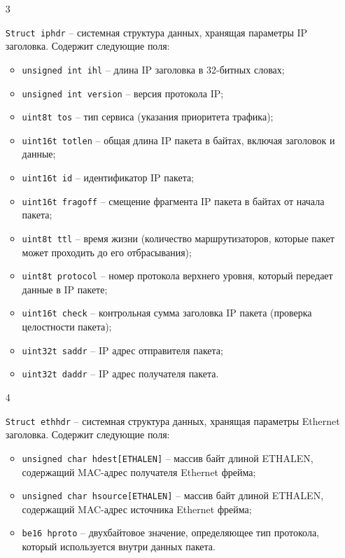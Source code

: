 \begin{enumerate}
    \item[3] {{\texttt{Struct iphdr}} -- системная структура данных, хранящая параметры IP
    заголовка. Содержит следующие поля:
        \begin{itemize}
            \item \texttt{unsigned int ihl} -- длина IP заголовка в 32-битных словах;
            \item \texttt{unsigned int version} -- версия протокола IP;
            \item \texttt{u{\textunderscore}int8{\textunderscore}t tos} -- тип сервиса (указания приоритета трафика);
            \item \texttt{u{\textunderscore}int16{\textunderscore}t tot{\textunderscore}len} -- общая длина IP пакета в байтах, включая
            заголовок и данные;
            \item \texttt{u{\textunderscore}int16{\textunderscore}t id} -- идентификатор IP пакета;
            \item \texttt{u{\textunderscore}int16{\textunderscore}t frag{\textunderscore}off} -- смещение фрагмента IP пакета в байтах от
            начала пакета;
            \item \texttt{u{\textunderscore}int8{\textunderscore}t ttl} -- время жизни (количество маршрутизаторов,
            которые пакет может проходить до его отбрасывания);
            \item \texttt{u{\textunderscore}int8{\textunderscore}t protocol} -- номер протокола верхнего уровня, который
            передает данные в IP пакете;
            \item \texttt{u{\textunderscore}int16{\textunderscore}t check} -- контрольная сумма заголовка IP пакета
            (проверка целостности пакета);
            \item \texttt{u{\textunderscore}int32{\textunderscore}t saddr} -- IP адрес отправителя пакета;
            \item \texttt{u{\textunderscore}int32{\textunderscore}t daddr} -- IP адрес получателя пакета.
        \end{itemize}}

    \item[4] {{\texttt{Struct ethhdr}} -- системная структура данных, хранящая параметры
    Ethernet заголовка. Содержит следующие поля:
        \begin{itemize}
            \item \texttt{unsigned char h{\textunderscore}dest[ETH{\textunderscore}ALEN]} -- массив байт длиной
            ETH{\textunderscore}ALEN, содержащий MAC-адрес получателя Ethernet фрейма;
            \item \texttt{unsigned char h{\textunderscore}source[ETH{\textunderscore}ALEN]} -- массив байт длиной
            ETH{\textunderscore}ALEN, содержащий MAC-адрес источника Ethernet фрейма;
            \item \texttt{be16 h{\textunderscore}proto} -- двухбайтовое значение, определяющее тип
            протокола, который используется внутри данных пакета.
        \end{itemize}}


\end{enumerate}
